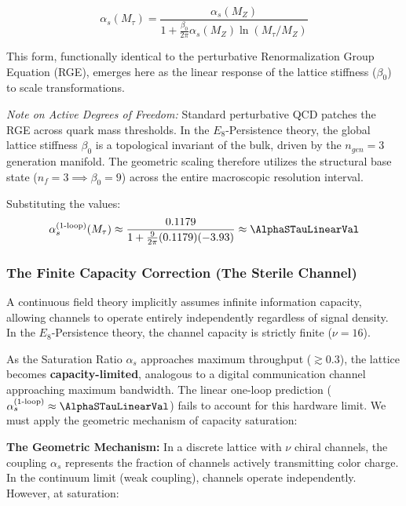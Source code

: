 \begin{equation}
\alpha_s(M_\tau) = \frac{\alpha_s(M_Z)}{1 + \frac{\beta_0}{2\pi} \alpha_s(M_Z) \ln(M_\tau/M_Z)}
\end{equation}

This form, functionally identical to the perturbative Renormalization Group Equation (RGE), emerges here as the linear response of the lattice stiffness ($\beta_0$) to scale transformations.

\textit{Note on Active Degrees of Freedom:} Standard perturbative QCD patches the RGE across quark mass thresholds. In the $E_8$-Persistence theory, the global lattice stiffness $\beta_0$ is a topological invariant of the bulk, driven by the $n_{gen}=3$ generation manifold. The geometric scaling therefore utilizes the structural base state ($n_f = 3 \implies \beta_0 = 9$) across the entire macroscopic resolution interval.

Substituting the values:
\begin{equation}
\alpha_s^{\text{(1-loop)}}(M_\tau) \approx \frac{0.1179}{1 + \frac{9}{2\pi}(0.1179)(-3.93)} \approx \AlphaSTauLinearVal
\end{equation}

\subsubsection{The Finite Capacity Correction (The Sterile Channel)}

A continuous field theory implicitly assumes infinite information capacity, allowing channels to operate entirely independently regardless of signal density. In the $E_8$-Persistence theory, the channel capacity is strictly finite ($\nu=16$). 

As the Saturation Ratio $\alpha_s$ approaches maximum throughput ($\gtrsim 0.3$), the lattice becomes \textbf{capacity-limited}, analogous to a digital communication channel approaching maximum bandwidth. The linear one-loop prediction ($\alpha_s^{\text{(1-loop)}} \approx \AlphaSTauLinearVal$) fails to account for this hardware limit. We must apply the geometric mechanism of capacity saturation:

\textbf{The Geometric Mechanism:}
In a discrete lattice with $\nu$ chiral channels, the coupling $\alpha_s$ represents the fraction of channels actively transmitting color charge. In the continuum limit (weak coupling), channels operate independently. However, at saturation:

